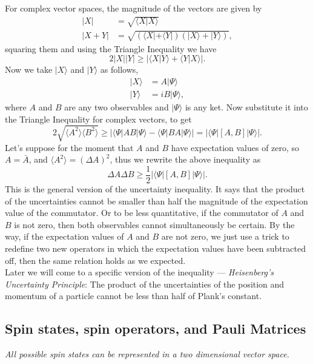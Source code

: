 \documentclass{article}
\newcommand{\be}{\begin{equation}}
\newcommand{\ee}{\end{equation}}
\newcommand{\bs}{\be\begin{split}}
\renewcommand{\1}{\left}
\renewcommand{\2}{\right}
\newcommand{\la}{\langle}
\newcommand{\ra}{\rangle}
\newcommand{\Del}{\Delta}
\begin{document}
For complex vector spaces, the magnitude of the vectors are given by
\bs
|X|&=\sqrt{\la X|X\ra}\\
|X+Y|&=\sqrt{(\la X|+\la Y|)(|X\ra+|Y\ra)},
\end{split}\ee
squaring them and using the Triangle Inequality we have
\be
2|X||Y|\geqslant |\la X|Y\ra+\la Y|X\ra|.
\ee
Now we take $|X\ra$ and $|Y\ra$ as follows,
\bs
|X\ra&=A|\Psi\ra\\
|Y\ra&=iB|\Psi\ra,
\end{split}\ee
where $A$ and $B$ are any two observables and $|\Psi\ra$ is any ket. Now substitute it into the Triangle Inequality for complex vectors, to get
\be
2\sqrt{\la A^2\ra\la B^2\ra} \geqslant |\la \Psi|AB|\Psi\ra-\la \Psi|BA|\Psi\ra|=|\la \Psi|[A,B]|\Psi\ra|.
\ee
Let's suppose for the moment that $A$ and $B$ have expectation values of zero, so $A=\bar A$, and $\la A^2\ra=(\Del A)^2$, thus we rewrite the above inequality as 
\be
\Del A\Del B\geqslant \frac 1 2|\la \Psi|[A,B]|\Psi\ra|.
\ee
This is the general version of the uncertainty inequality. It says that the product of the uncertainties cannot be smaller than half the magnitude of the expectation value of the commutator. Or to be less quantitative, if the commutator of $A$ and $B$ is not zero, then both observables cannot simultaneously be certain. By the way, if the expectation values of $A$ and $B$ are not zero, we just use a trick to redefine two new operators in which the expectation values have been subtracted off, then the same relation holds as we expected.\\

Later we will come to a specific version of the inequality --- \textit{Heisenberg's Uncertainty Principle}: The product of the uncertainties of the position and momentum of a particle cannot be less than half of Plank's constant.


\subsection{Spin states, spin operators, and Pauli Matrices}
\textit{All possible spin states can be represented in a two dimensional vector space.}
\end{document}
